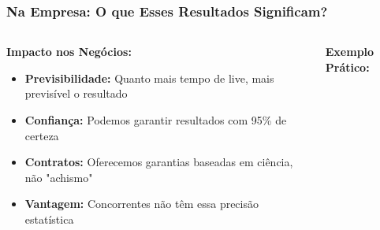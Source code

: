 \documentclass[aspectratio=169,12pt]{beamer}
\begin{document}
\begin{frame}
    \frametitle{Na Empresa: O que Esses Resultados Significam?}
    
    \begin{columns}
        \begin{column}{0.6\textwidth}
            \textbf{\Large Impacto nos Negócios:}
            \vspace{0.5cm}
            
            \begin{itemize}
                \item[\faIcon{trending-up}] \textcolor{azulprincipal}{\textbf{Previsibilidade:}} Quanto mais tempo de live, mais previsível o resultado
                \vspace{0.3cm}
                
                \item[\faIcon{shield-alt}] \textcolor{azulprincipal}{\textbf{Confiança:}} Podemos garantir resultados com 95\% de certeza
                \vspace{0.3cm}
                
                \item[\faIcon{handshake}] \textcolor{azulprincipal}{\textbf{Contratos:}} Oferecemos garantias baseadas em ciência, não "achismo"
                \vspace{0.3cm}
                
                \item[\faIcon{trophy}] \textcolor{azulprincipal}{\textbf{Vantagem:}} Concorrentes não têm essa precisão estatística
            \end{itemize}
        \end{column}
        
        \begin{column}{0.4\textwidth}
            \begin{center}
                \textbf{\large Exemplo Prático:}
                \vspace{0.3cm}
                
\end{center}
\end{column}
\end{columns}
\end{frame}
\end{document}
